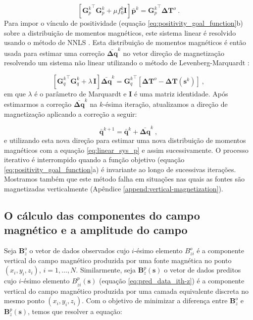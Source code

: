 \begin{equation}
\left[ {\mathbf{G}_{p}^{k}}^{\top} \mathbf{G}_{p}^{k} + 
\mu f_{0}^{k} \mathbf{I} \right] \bar{\mathbf{p}}^{k} = {\mathbf{G}_{p}^{k}}^{\top} \mathbf{\Delta T}^{o} \: .
\label{eq:linear_sys_p}
\end{equation}
Para impor o vínculo de positividade (equação \ref{eq:positivity_goal_function}b) sobre a distribuição de momentos magnéticos, este sistema linear é resolvido usando o método de NNLS \citep{lawson_hanson_1974, silvadias_etal_2010}. Esta distribuição de momentos magnéticos é então usada para estimar uma correção $\bar{\mathbf{\Delta q}}^{k}$ no vetor direção de magnetização resolvendo um sistema não linear utilizando o método de Levenberg-Marquardt \citep{aster2005}:

\begin{equation}
\left[ {\mathbf{G}_{q}^{k}}^{\top} \mathbf{G}_{q}^{k} + \lambda \, \mathbf{I} \right] 
\bar{\mathbf{\Delta q}}^{k} = {\mathbf{G}_{q}^{k}}^{\top} 
\left[ \mathbf{\Delta T}^{o} - \mathbf{\Delta T} (\mathbf{s}^{k}) \right] \: ,
\label{eq:linear_sys_q}
\end{equation}
em que $\lambda$ é o parâmetro de Marquardt e $\mathbf{I}$ é uma matriz identidade. Após estimarmos a correção $\bar{\mathbf{\Delta q}}^{k}$ na $k$-ésima iteração, atualizamos a direção de magnetização aplicando a correção a seguir:

\begin{equation}
\bar{\mathbf{q}}^{k+1} = \bar{\mathbf{q}}^{k} + \bar{\mathbf{\Delta q}}^{k} \: ,
\label{eq:q_next}
\end{equation}
e utilizando esta nova direção para estimar uma nova distribuição de momentos magnéticos com a equação \ref{eq:linear_sys_p} e assim sucessivamente. O processo iterativo é interrompido quando a função objetivo (equação \ref{eq:positivity_goal_function}a) é invariante ao longo de sucessivas iterações. Mostramos também que este método falha em situações nas quais as fontes são magnetizadas verticalmente (Apêndice \ref{append:vertical-magnetization}).

\subsection{O cálculo das componentes do campo magnético e a amplitude do campo}
\label{subsec:componentes_vec}

Seja $\mathbf{B}_{z}^{o}$ o vetor de dados observados cujo $i$-ésimo elemento $B_{zi}^{o}$ é a componente vertical do campo magnético produzida por uma fonte magnética no ponto $(x_{i},y_{i},z_{i})$, $i = 1, \dots, N$. Similarmente, seja $\mathbf{B}_{z}^{p} (\mathbf{s})$ o vetor de dados preditos cujo $i$-ésimo elemento $B_{zi}^{p}(\mathbf{s})$ (equação \ref{eq:pred_data_ith-z}) é a componente vertical do campo magnético produzida por uma camada equivalente discreta no mesmo ponto $(x_{i},y_{i},z_{i})$. Com o objetivo de minimizar a diferença entre $\mathbf{B}_{z}^{o}$ e $\mathbf{B}_{z}^{p} (\mathbf{s})$, temos que resolver a equação:

